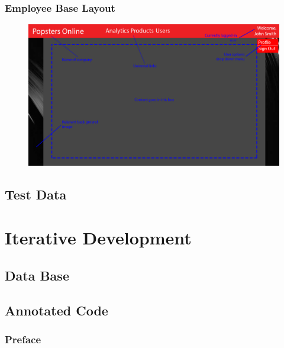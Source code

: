 ﻿\documentclass{article}
\begin{document}
    \paragraph{}

    \newpage
    \subsubsection{Employee Base Layout}
    \begin{figure}[h]
        \includegraphics[width=\textwidth]{employeeBasic.png}
        \centering
    \end{figure}
    \paragraph{}

    \subsection{Test Data}
    
    
    \section{Iterative Development}
    \subsection{Data Base}

    \subsection{Annotated Code}
    \subsubsection{Preface}
\end{document}
